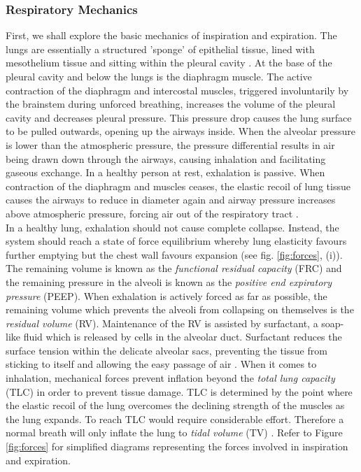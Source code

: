\documentclass[12pt, openany, oneside]{book}
\begin{document}




\subsubsection{Respiratory Mechanics}

First, we shall explore the basic mechanics of inspiration and expiration. The lungs are essentially a structured 'sponge' of epithelial tissue, lined with mesothelium tissue and sitting within the pleural cavity \citep{hist}. At the base of the pleural cavity and below the lungs is the diaphragm muscle. The active contraction of the diaphragm and intercostal muscles, triggered involuntarily by the brainstem during unforced breathing, increases the volume of the pleural cavity and decreases pleural pressure. This pressure drop causes the lung surface to be pulled outwards, opening up the airways inside. When the alveolar pressure is lower than the atmospheric pressure, the pressure differential results in air being drawn down through the airways, causing inhalation and facilitating gaseous exchange. In a healthy person at rest, exhalation is passive. When contraction of the diaphragm and muscles ceases, the elastic recoil of lung tissue causes the airways to reduce in diameter again and airway pressure increases above atmospheric pressure, forcing air out of the respiratory tract \citep{respShade}. \\

In a healthy lung, exhalation should not cause complete collapse. Instead, the system should reach a state of force equilibrium whereby lung elasticity favours further emptying but the chest wall favours expansion (see fig. \ref{fig:forces}, (i)). The remaining volume is known as the \textit{functional residual capacity} (FRC) and the remaining pressure in the alveoli is known as the \textit{positive end expiratory pressure} (PEEP). When exhalation is actively forced as far as possible, the remaining volume which prevents the alveoli from collapsing on themselves is the \textit{residual volume} (RV). Maintenance of the RV is assisted by surfactant, a soap-like fluid which is released by cells in the alveolar duct. Surfactant reduces the surface tension within the delicate alveolar sacs, preventing the tissue from sticking to itself and allowing the easy passage of air \citep{hist, respShade}.  When it comes to inhalation, mechanical forces prevent inflation beyond the \textit{total lung capacity} (TLC) in order to prevent tissue damage. TLC is determined by the point where the elastic recoil of the lung overcomes the declining strength of the muscles as the lung expands. To reach TLC would require considerable effort. Therefore a normal breath will only inflate the lung to \textit{tidal volume} (TV) \citep{respShade}. Refer to Figure \ref{fig:forces} for simplified diagrams representing the forces involved in inspiration and expiration.\\ 
\end{document}
